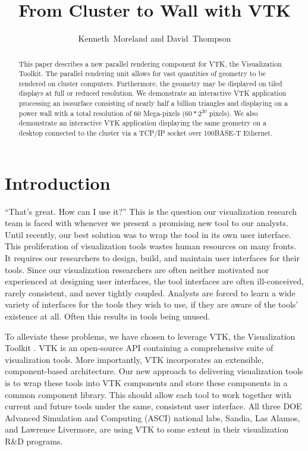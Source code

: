 \documentclass[twocolumn]{article}
\title{From Cluster to Wall with VTK}
\author{Kenneth~Moreland and David~Thompson}
\begin{document}
  \maketitle

  \begin{abstract}
    This paper describes a new parallel rendering component for VTK, the
    Visualization Toolkit.  The parallel rendering unit allows for vast
    quantities of geometry to be rendered on cluster computers.
    Furthermore, the geometry may be displayed on tiled displays at full or
    reduced resolution.  We demonstrate an interactive VTK application
    processing an isosurface consisting of nearly half a billion triangles
    and displaying on a power wall with a total resolution of 60
    Mega-pixels ($60*2^{20}$ pixels).  We also demonstrate an interactive
    VTK application displaying the same geometry on a desktop connected to
    the cluster via a TCP/IP socket over 100BASE-T Ethernet.
  \end{abstract}

  \section{Introduction}
  \label{sec:introduction}

  ``That's great.  How can I use it?''  This is the question our
  visualization research team is faced with whenever we present a promising
  new tool to our analysts.  Until recently, our best solution was to wrap
  the tool in its own user interface.  This proliferation of visualization
  tools wastes human resources on many fronts.  It requires our researchers
  to design, build, and maintain user interfaces for their tools.  Since
  our visualization researchers are often neither motivated nor experienced
  at designing user interfaces, the tool interfaces are often
  ill-conceived, rarely consistent, and never tightly coupled.  Analysts
  are forced to learn a wide variety of interfaces for the tools they wish
  to use, if they are aware of the tools' existence at all.  Often this
  results in tools being unused.

  To alleviate these problems, we have chosen to leverage VTK, the
  Visualization Toolkit \cite{Schroeder98}.  VTK is an open-source API
  containing a comprehensive suite of visualization tools.  More
  importantly, VTK incorporates an extensible, component-based
  architecture.  Our new approach to delivering visualization tools is to
  wrap these tools into VTK components and store these components in a
  common component library.  This should allow each tool to work together
  with current and future tools under the same, consistent user interface.
  All three DOE Advanced Simulation and Computing (ASCI) national labs,
  Sandia, Las Alamos, and Lawrence Livermore, are using VTK to some extent
  in their visualization R\&D programs.
\end{document}
